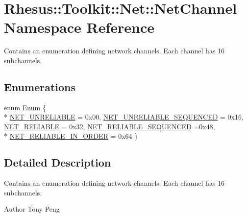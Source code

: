 \hypertarget{namespace_rhesus_1_1_toolkit_1_1_net_1_1_net_channel}{\section{Rhesus\-:\-:Toolkit\-:\-:Net\-:\-:Net\-Channel Namespace Reference}
\label{namespace_rhesus_1_1_toolkit_1_1_net_1_1_net_channel}
}


Contains an enumeration defining network channels. Each channel has 16 subchannels.  


\subsection*{Enumerations}
\begin{DoxyCompactItemize}
\item 
enum \hyperlink{namespace_rhesus_1_1_toolkit_1_1_net_1_1_net_channel_acf0293f3b2ad1085b27f1d7feff35033}{Enum} \{ \\*
\hyperlink{namespace_rhesus_1_1_toolkit_1_1_net_1_1_net_channel_acf0293f3b2ad1085b27f1d7feff35033a878d416c72820dd86b8bb5cff1d7b1c7}{N\-E\-T\-\_\-\-U\-N\-R\-E\-L\-I\-A\-B\-L\-E} = 0x00, 
\hyperlink{namespace_rhesus_1_1_toolkit_1_1_net_1_1_net_channel_acf0293f3b2ad1085b27f1d7feff35033a9e5f3c0740128927a77e777c367e73f5}{N\-E\-T\-\_\-\-U\-N\-R\-E\-L\-I\-A\-B\-L\-E\-\_\-\-S\-E\-Q\-U\-E\-N\-C\-E\-D} = 0x16, 
\hyperlink{namespace_rhesus_1_1_toolkit_1_1_net_1_1_net_channel_acf0293f3b2ad1085b27f1d7feff35033af87fdfd8c1794b2f1a066b7dca52bae7}{N\-E\-T\-\_\-\-R\-E\-L\-I\-A\-B\-L\-E} = 0x32, 
\hyperlink{namespace_rhesus_1_1_toolkit_1_1_net_1_1_net_channel_acf0293f3b2ad1085b27f1d7feff35033a14647840d604dcd1d8ccbf8590ba0ffc}{N\-E\-T\-\_\-\-R\-E\-L\-I\-A\-B\-L\-E\-\_\-\-S\-E\-Q\-U\-E\-N\-C\-E\-D} =0x48, 
\\*
\hyperlink{namespace_rhesus_1_1_toolkit_1_1_net_1_1_net_channel_acf0293f3b2ad1085b27f1d7feff35033a529b76097a778986c6884ac76adbbb6e}{N\-E\-T\-\_\-\-R\-E\-L\-I\-A\-B\-L\-E\-\_\-\-I\-N\-\_\-\-O\-R\-D\-E\-R} = 0x64
 \}
\end{DoxyCompactItemize}


\subsection{Detailed Description}
Contains an enumeration defining network channels. Each channel has 16 subchannels. \begin{DoxyAuthor}{Author}
Tony Peng 
\end{DoxyAuthor}


